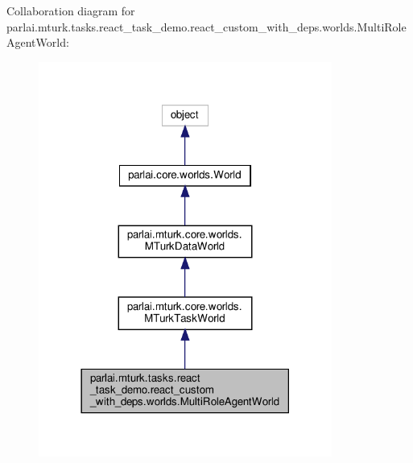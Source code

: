Collaboration diagram for parlai.\+mturk.\+tasks.\+react\+\_\+task\+\_\+demo.\+react\+\_\+custom\+\_\+with\+\_\+deps.\+worlds.\+Multi\+Role\+Agent\+World\+:
\nopagebreak
\begin{figure}[H]
\begin{center}
\leavevmode
\includegraphics[width=273pt]{d5/d52/classparlai_1_1mturk_1_1tasks_1_1react__task__demo_1_1react__custom__with__deps_1_1worlds_1_1MultiRoleAgentWorld__coll__graph}
\end{center}
\end{figure}
